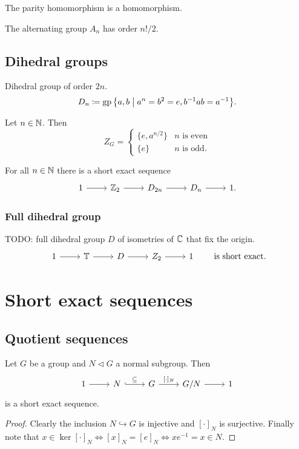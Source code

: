 \begin{proposition}
The parity homomorphism is a homomorphism.
\end{proposition}

\begin{lemma}
The alternating group $A_n$ has order $n!/2$.
\end{lemma}

\subsection{Dihedral groups}
\begin{definition}
Dihedral group of order $2n$.
\[ D_n \defeq \group\setbuilder{ a,b }{a^n=b^2=e, b^{-1}ab = a^{-1} }. \]
\end{definition}

\begin{proposition}
Let $n\in \mathbb{N}$. Then
\[ Z_G = \begin{cases}
\{e, a^{n/2}\} & \text{$n$ is even} \\
\{e\} & \text{$n$ is odd}.
\end{cases} \]
\end{proposition}
\begin{corollary} \label{dihedralDoubleCover}
For all $n\in \mathbb{N}$ there is a short exact sequence
\[ \begin{tikzcd}
1 \rar & \Z_2 \rar & D_{2n} \rar & D_n \rar & 1.
\end{tikzcd} \]
\end{corollary}

\subsubsection{Full dihedral group}
TODO: full dihedral group $D$ of isometries of $\mathbb{C}$ that fix the origin.
\[ \begin{tikzcd}
1 \rar & \T \rar & D\rar & Z_2 \rar & 1
\end{tikzcd} \qquad\text{is short exact.} \]

\section{Short exact sequences}
\subsection{Quotient sequences}
\begin{proposition}
Let $G$ be a group and $N\lhd G$ a normal subgroup. Then
\[ \begin{tikzcd}
1 \rar & N \rar[hookrightarrow]{\subseteq} & G \rar{[\cdot]_N} & G/N \rar & 1
\end{tikzcd} \]
is a short exact sequence.
\end{proposition}
\begin{proof}
Clearly the inclusion $N\hookrightarrow G$ is injective and $[\cdot]_N$ is surjective. Finally note that $x\in \ker[\cdot]_N \iff [x]_N = [e]_N \iff xe^{-1} = x\in N$.
\end{proof}

